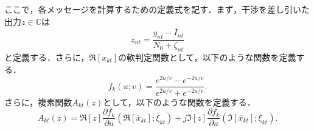 ここで，各メッセージを計算するための定義式を記す．まず，干渉を差し引いた出力$z\in\mathbb{C}$は
\begin{equation} 
	\label{eq:z}
	z_{nt}=\frac{y_{nt}-\overline{I}_{nt}}{N_{0}+\zeta_{nt}}
\end{equation}
と定義する．さらに，$\Re[x_{kt}]$の軟判定関数として，以下のような関数を定義する．
\begin{equation} 
	\label{eq:fk}
	f_{k}(u;v)=\frac{e^{2u/v}-e^{-2u/v}}{e^{2u/v}+e^{-2u/v}}.
\end{equation}
さらに，複素関数$A_{kt}(z)$として，以下のような関数を定義する．
\begin{equation} 
	\label{eq:Akt}
	A_{kt}(z)=\Re[z]\frac{\partial f_{k}}{\partial u}(\Re[\overline{x}_{kt}];\overline{\xi}_{kt})+j\Im[z]\frac{\partial f_{k}}{\partial u}(\Im[\overline{x}_{kt}];\overline{\xi}_{kt}).
\end{equation}

